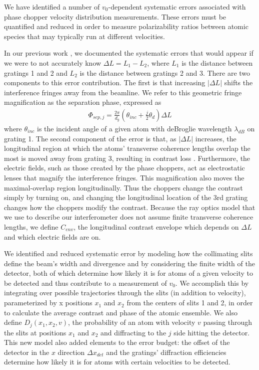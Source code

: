 \documentclass[twocolumn,prl,showpacs,superscriptaddress]{revtex4-1}   %
\begin{document}
We have identified a number of $v_0$-dependent systematic errors associated with phase chopper velocity distribution measurements. These errors must be quantified and reduced in order to measure polarizability ratios between atomic species that may typically run at different velocities.

In our previous work \cite{Hromada2014}, we documented the systematic errors that would appear if we were to not accurately know $\Delta L = L_1 - L_2$, where $L_1$ is the distance between gratings 1 and 2 and $L_2$ is the distance between gratings 2 and 3. There are two components to this error contribution. The first is that increasing $|\Delta L|$ shifts the interference fringes away from the beamline. We refer to this geometric fringe magnification as the separation phase, expressed as
\begin{align}
	\Phi_{sep,j} = \frac{2\pi}{d_g}
	\left(
		\theta_{inc} + \frac{j}{2}\theta_d
	\right) \Delta L
	\label{phiSep}
\end{align}
where $\theta_{inc}$ is the incident angle of a given atom with deBroglie wavelength $\lambda_{dB}$ on grating 1. The second component of the error is that, as $|\Delta L|$ increases, the longitudinal region at which the atoms' transverse coherence lengths overlap the most is moved away from grating 3, resulting in contrast loss \cite{Champenois1999,McMorran2008}. Furthermore, the electric fields, such as those created by the phase choppers, act as electrostatic lenses that magnify the interference fringes. This magnification also moves the maximal-overlap region longitudinally. Thus the choppers change the contrast simply by turning on, and changing the longitudinal location of the 3rd grating changes how the choppers modify the contrast. Because the ray optics model that we use to describe our interferometer does not assume finite transverse coherence lengths, we define $C_{env}$, the longitudinal contrast envelope which depends on $\Delta L$ and which electric fields are on.

We identified and reduced systematic error by modeling how the collimating slits define the beam's width and divergence and by considering the finite width of the detector, both of which determine how likely it is for atoms of a given velocity to be detected and thus contribute to a measurement of $v_0$. 
We accomplish this by integrating over possible trajectories through the slits (in addition to velocity), parameterized by x positions $x_1$ and $x_2$ from the centers of slits 1 and 2, in order to calculate the average contrast and phase of the atomic ensemble. We also define $D_j(x_1,x_2,v)$, the probability of an atom with velocity $v$ passing through the slits at positions $x_1$ and $x_2$ and diffracting to the $j$ side hitting the detector.
This new model also added elements to the error budget: the offset of the detector in the $x$ direction $\Delta x_{det}$ and the gratings' diffraction efficiencies determine how likely it is for atoms with certain velocities to be detected.
\end{document}
